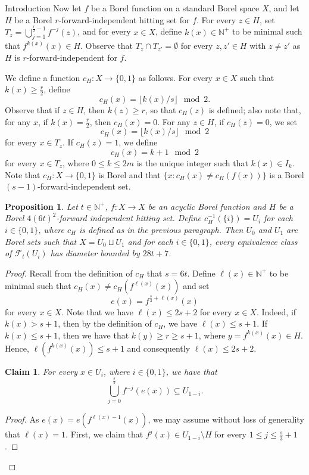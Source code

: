 \documentclass[psamsfonts]{amsart}
\newtheorem{prop}[thm]{Proposition}
\newtheorem{claim}[thm]{Claim}
\theoremstyle{definition}
\newcommand{\N}{\mathbb N}
\theoremstyle{remark}
\numberwithin{equation}{section}
\newcommand\mcal{\mathcal}
\begin{document}
\begin{section}{Introduction}
    Now let $f$ be a Borel function on a standard Borel space $X$, and let $H$ be a Borel $r$-forward-independent hitting set for $f$.
    For every $z\in H$, set $T_z=\bigcup_{j=1}^{\frac{r}{2}-1} f^{-j}(z)$, and for every $x\in X$, define $k(x)\in \N^+$ to be minimal such that $f^{k(x)}(x)\in H$.
    Observe that $T_z\cap T_{z'}=\emptyset$ for every $z, z'\in H$ with $z \neq z'$ as $H$ is $r$-forward-independent for $f$.

    We define a function $c_H:X\to \{0,1\}$ as follows.
    For every $x\in X$ such that $k(x)\ge \frac{r}{2}$, define 
    $$c_H(x)=\lfloor k(x)/s \rfloor \mod 2.$$
    Observe that if $z\in H$, then $k(z)\ge r$, so that $c_{H}(z)$ is defined; also note that, for any $x$, if $k(x)=\frac{r}{2}$, then $c_H(x)=0$.
    For any $z \in H$, if $c_H(z) = 0$, we set 
    $$c_H(x)=\lfloor k(x)/s \rfloor \mod 2$$
    for every $x\in T_z$.
    If $c_H(z) = 1$, we define 
    $$c_H(x)=k+1 \mod 2$$
    for every $x\in T_z$, where $0 \leq k \leq 2m$ is the unique integer such that $k(x)\in I_k$.
    Note that $c_H:X\to \{0,1\}$ is Borel and that $\{x : c_H(x) \neq c_H(f(x)) \}$ is a Borel $(s - 1)$-forward-independent set.

    \begin{prop}\label{pr:FIHtoCov}
        Let $t\in \N^+$, $f:X\to X$ be an acyclic Borel function and $H$ be a Borel $4(6t)^2$-forward independent hitting set.
        Define $c^{-1}_H(\{i\})=U_i$ for each $i\in \{0,1\}$, where $c_H$ is defined as in the previous paragraph.
        Then $U_0$ and $U_1$ are Borel sets such that $X=U_0\sqcup U_1$ and for each $i \in \{0, 1\}$, every equivalence class of $\mcal{F}_t(U_i)$ has diameter bounded by $28t+7$.
    \end{prop}
    \begin{proof}
        Recall from the definition of $c_H$ that $s=6t$.
        Define $\ell(x)\in \N^+$ to be minimal such that $c_H(x)\not=c_H(f^{\ell(x)}(x))$ and set
        $$e(x)=f^{\frac{s}{3}+\ell(x)}(x)$$
        for every $x\in X$.
        Note that we have $\ell(x)\le 2s+2$ for every $x\in X$.
        Indeed, if $k(x) > s + 1$, then by the definition of $c_{H}$, we have $\ell(x) \leq s + 1$.
        If $k(x) \leq s + 1$, then we have that $k(y) \ge r \geq s + 1$, where $y=f^{k(x)}(x)\in H$.        
        Hence, $\ell(f^{k(x)}(x)) \leq s + 1$ and consequently $\ell(x) \leq 2s + 2$.
        
        \begin{claim}\label{cl:BasicThree}
            For every $x\in U_i$, where $i\in \{0,1\}$, we have that
            $$\bigcup_{j=0}^{\frac{s}{3}} f^{-j}(e(x))\subseteq U_{1-i}.$$
        \end{claim}
        \begin{proof}
            As $e(x)=e(f^{\ell(x)-1}(x))$, we may assume without loss of generality that $\ell(x)=1$.
            First, we claim that $f^j(x)\in U_{1-i}\setminus H$ for every $1\le j\le \frac{s}{3}+1$.


\end{proof}
\end{proof}
\end{section}
\end{document}
